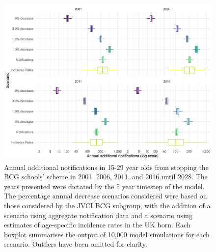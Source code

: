 \documentclass[11pt,twoside]{bristolthesis}
\begin{document}
  \begin{figure}
  
  {\centering \includegraphics[width=0.8\linewidth,]{chapters/evidence-policy-change/graph-avg-add-nots-1} 
  
  }
  
  \caption[Annual additional notifications in 15-29 year olds from stopping the BCG schools' scheme in 2001, 2006, 2011, and 2016 until 2028.]{Annual additional notifications in 15-29 year olds from stopping the BCG schools' scheme in 2001, 2006, 2011, and 2016 until 2028. The years presented were dictated by the 5 year timestep of the model. The percentage annual decrease scenarios considered were based on those considered by the JVCI BCG subgroup, with the addition of a scenario using aggregate notification data and a scenario using estimates of age-specific incidence rates in the UK born. Each boxplot summarises the output of 10,000 model simulations for each scenario. Outliers have been omitted for clarity.}\label{fig:graph-avg-add-not}
  \end{figure}
\end{document}
